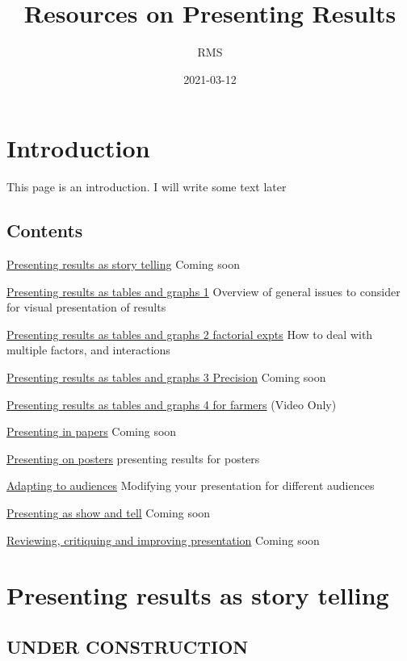 \documentclass[
]{book}
\title{Resources on Presenting Results}
\author{RMS}
\date{2021-03-12}
\begin{document}
\maketitle

{
\setcounter{tocdepth}{1}
\tableofcontents
}
\hypertarget{introduction}{%
\chapter{Introduction}\label{introduction}}

This page is an introduction. I will write some text later

\hypertarget{contents}{%
\section{Contents}\label{contents}}

\protect\hyperlink{story}{Presenting results as story telling}
Coming soon

\protect\hyperlink{tablegraph1}{Presenting results as tables and graphs 1}
Overview of general issues to consider for visual presentation of results

\protect\hyperlink{factor}{Presenting results as tables and graphs 2 factorial expts}
How to deal with multiple factors, and interactions

\protect\hyperlink{precision}{Presenting results as tables and graphs 3 Precision}
Coming soon

\protect\hyperlink{farmers}{Presenting results as tables and graphs 4 for farmers}
(Video Only)

\protect\hyperlink{papers}{Presenting in papers}
Coming soon

\protect\hyperlink{posters}{Presenting on posters}
presenting results for posters

\protect\hyperlink{audience}{Adapting to audiences}
Modifying your presentation for different audiences

\protect\hyperlink{showandtell}{Presenting as show and tell}
Coming soon

\protect\hyperlink{review}{Reviewing, critiquing and improving presentation}
Coming soon

\hypertarget{story}{%
\chapter{Presenting results as story telling}\label{story}}

\hypertarget{under-construction}{%
\section{UNDER CONSTRUCTION}\label{under-construction}}
\end{document}
